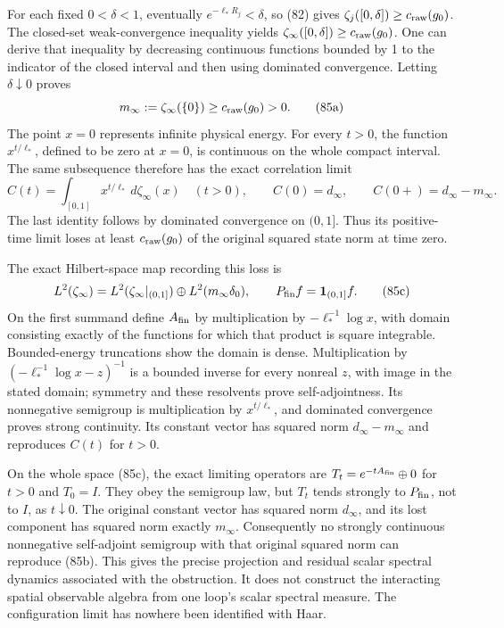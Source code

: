 \documentclass[
  11pt,
]{article}
\begin{document}
For each fixed \(0<\delta<1\), eventually \(e^{-\ell_*R_j}<\delta\), so
(82) gives \(\zeta_j([0,\delta])\ge c_{\rm raw}(g_0)\). The closed-set
weak-convergence inequality yields
\(\zeta_\infty([0,\delta])\ge c_{\rm raw}(g_0)\). One can derive that
inequality by decreasing continuous functions bounded by 1 to the
indicator of the closed interval and then using dominated convergence.
Letting \(\delta\downarrow0\) proves \[
 m_\infty:=\zeta_\infty(\{0\})\ge c_{\rm raw}(g_0)>0.
 \tag{85a}
\] The point \(x=0\) represents infinite physical energy. For every
\(t>0\), the function \(x^{t/\ell_*}\), defined to be zero at \(x=0\),
is continuous on the whole compact interval. The same subsequence
therefore has the exact correlation limit \[
 C(t)=\int_{[0,1]}x^{t/\ell_*}\,d\zeta_\infty(x)\quad(t>0),
 \qquad C(0)=d_\infty,\qquad
 C(0+)=d_\infty-m_\infty .
 \tag{85b}
\] The last identity follows by dominated convergence on \((0,1]\). Thus
its positive-time limit loses at least \(c_{\rm raw}(g_0)\) of the
original squared state norm at time zero.

The exact Hilbert-space map recording this loss is \[
 L^2(\zeta_\infty)
 =L^2(\zeta_\infty|_{(0,1]})\oplus L^2(m_\infty\delta_0),
 \qquad P_{\rm fin}f=\mathbf1_{(0,1]}f .
 \tag{85c}
\] On the first summand define \(A_{\rm fin}\) by multiplication by
\(-\ell_*^{-1}\log x\), with domain consisting exactly of the functions
for which that product is square integrable. Bounded-energy truncations
show the domain is dense. Multiplication by
\((-\ell_*^{-1}\log x-z)^{-1}\) is a bounded inverse for every nonreal
\(z\), with image in the stated domain; symmetry and these resolvents
prove self-adjointness. Its nonnegative semigroup is multiplication by
\(x^{t/\ell_*}\), and dominated convergence proves strong continuity.
Its constant vector has squared norm \(d_\infty-m_\infty\) and
reproduces \(C(t)\) for \(t>0\).

On the whole space (85c), the exact limiting operators are
\(T_t=e^{-tA_{\rm fin}}\oplus0\) for \(t>0\) and \(T_0=I\). They obey
the semigroup law, but \(T_t\) tends strongly to \(P_{\rm fin}\), not to
\(I\), as \(t\downarrow0\). The original constant vector has squared
norm \(d_\infty\), and its lost component has squared norm exactly
\(m_\infty\). Consequently no strongly continuous nonnegative
self-adjoint semigroup with that original squared norm can reproduce
(85b). This gives the precise projection and residual scalar spectral
dynamics associated with the obstruction. It does not construct the
interacting spatial observable algebra from one loop's scalar spectral
measure. The configuration limit has nowhere been identified with Haar.
\end{document}
